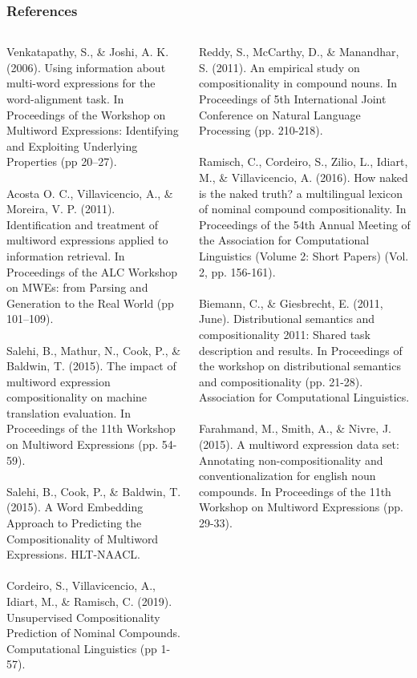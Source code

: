 \documentclass{beamer}
\begin{document}
\begin{frame}
\frametitle{References}
\tiny
\begin{columns}[T] %
\begin{column}{.48\textwidth}
Venkatapathy, S., \& Joshi, A. K. (2006). Using information about multi-word expressions for the word-alignment task. In Proceedings of the Workshop on Multiword Expressions: Identifying and Exploiting Underlying Properties (pp 20--27).\\~\\
Acosta O. C., Villavicencio, A., \& Moreira, V. P. (2011). Identification and treatment of multiword expressions applied to information retrieval. In Proceedings of the ALC Workshop on MWEs: from Parsing and Generation to the Real World (pp 101--109).\\~\\
Salehi, B., Mathur, N., Cook, P., \& Baldwin, T. (2015). The impact of multiword expression compositionality on machine translation evaluation. In Proceedings of the 11th Workshop on Multiword Expressions (pp. 54-59).\\~\\
Salehi, B., Cook, P., \& Baldwin, T. (2015). A Word Embedding Approach to Predicting the Compositionality of Multiword Expressions. HLT-NAACL. \\~\\
Cordeiro, S., Villavicencio, A., Idiart, M., \& Ramisch, C. (2019). Unsupervised Compositionality Prediction of Nominal Compounds. Computational Linguistics (pp 1-57).
\end{column}%
\hfill%
\begin{column}{.48\textwidth}
Reddy, S., McCarthy, D., \& Manandhar, S. (2011). An empirical study on compositionality in compound nouns. In Proceedings of 5th International Joint Conference on Natural Language Processing (pp. 210-218).\\~\\
Ramisch, C., Cordeiro, S., Zilio, L., Idiart, M., \& Villavicencio, A. (2016). How naked is the naked truth? a multilingual lexicon of nominal compound compositionality. In Proceedings of the 54th Annual Meeting of the Association for Computational Linguistics (Volume 2: Short Papers) (Vol. 2, pp. 156-161).\\~\\
Biemann, C., \& Giesbrecht, E. (2011, June). Distributional semantics and compositionality 2011: Shared task description and results. In Proceedings of the workshop on distributional semantics and compositionality (pp. 21-28). Association for Computational Linguistics.\\~\\
Farahmand, M., Smith, A., \& Nivre, J. (2015). A multiword expression data set: Annotating non-compositionality and conventionalization for english noun compounds. In Proceedings of the 11th Workshop on Multiword Expressions (pp. 29-33).
\end{column}%
\end{columns}
\end{frame}

\end{document}
